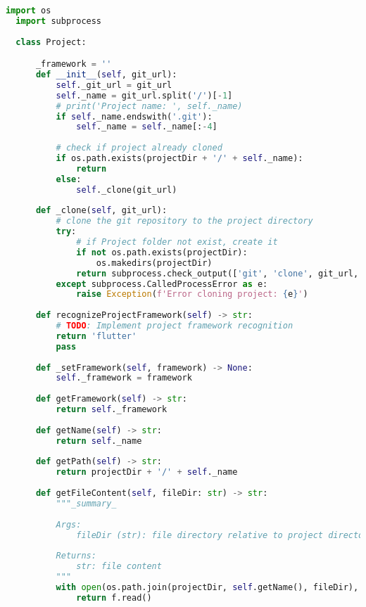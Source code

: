 \begin{lstlisting}[language=Python, caption={$\texttt{Project}$ class.}, label={lst:1}]
  import os
  import subprocess
  
  class Project:

      _framework = ''
      def __init__(self, git_url):
          self._git_url = git_url
          self._name = git_url.split('/')[-1]
          # print('Project name: ', self._name)
          if self._name.endswith('.git'):
              self._name = self._name[:-4]
          
          # check if project already cloned
          if os.path.exists(projectDir + '/' + self._name):
              return
          else:
              self._clone(git_url)
      
      def _clone(self, git_url):
          # clone the git repository to the project directory
          try:
              # if Project folder not exist, create it
              if not os.path.exists(projectDir):
                  os.makedirs(projectDir)
              return subprocess.check_output(['git', 'clone', git_url, projectDir + '/' + self._name], universal_newlines=True)
          except subprocess.CalledProcessError as e:
              raise Exception(f'Error cloning project: {e}')
      
      def recognizeProjectFramework(self) -> str:
          # TODO: Implement project framework recognition
          return 'flutter'
          pass
      
      def _setFramework(self, framework) -> None:
          self._framework = framework
          
      def getFramework(self) -> str:
          return self._framework
      
      def getName(self) -> str:
          return self._name
      
      def getPath(self) -> str:
          return projectDir + '/' + self._name
          
      def getFileContent(self, fileDir: str) -> str:
          """_summary_
  
          Args:
              fileDir (str): file directory relative to project directory
  
          Returns:
              str: file content
          """
          with open(os.path.join(projectDir, self.getName(), fileDir), 'r') as f:
              return f.read()
\end{lstlisting}

